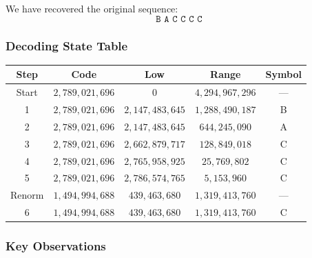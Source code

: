 \documentclass[12pt]{article}
\begin{document}
We have recovered the original sequence:
\[
\boxed{\texttt{B A C C C C}}
\]

\subsubsection*{Decoding State Table}

\begin{center}
\begin{tabular}{c|c|c|c|c}
\hline
\textbf{Step} & \textbf{Code} & \textbf{Low} & \textbf{Range} & \textbf{Symbol} \\ \hline
Start & $2{,}789{,}021{,}696$ & $0$ & $4{,}294{,}967{,}296$ & — \\
1 & $2{,}789{,}021{,}696$ & $2{,}147{,}483{,}645$ & $1{,}288{,}490{,}187$ & B \\
2 & $2{,}789{,}021{,}696$ & $2{,}147{,}483{,}645$ & $644{,}245{,}090$ & A \\
3 & $2{,}789{,}021{,}696$ & $2{,}662{,}879{,}717$ & $128{,}849{,}018$ & C \\
4 & $2{,}789{,}021{,}696$ & $2{,}765{,}958{,}925$ & $25{,}769{,}802$ & C \\
5 & $2{,}789{,}021{,}696$ & $2{,}786{,}574{,}765$ & $5{,}153{,}960$ & C \\
Renorm & $1{,}494{,}994{,}688$ & $439{,}463{,}680$ & $1{,}319{,}413{,}760$ & — \\
6 & $1{,}494{,}994{,}688$ & $439{,}463{,}680$ & $1{,}319{,}413{,}760$ & C \\ \hline
\end{tabular}
\end{center}

\subsubsection*{Key Observations}
\end{document}
